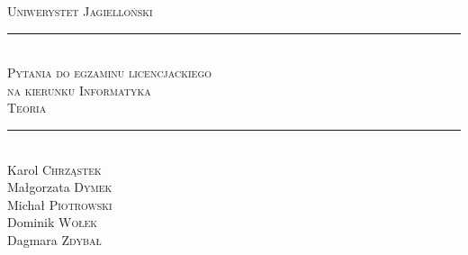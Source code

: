 \documentclass[12pt]{article}
\begin{document}
    \begin{titlepage}

        \newcommand{\HRule}{\rule{\linewidth}{0.5mm}}

        \center

        \textsc{\LARGE Uniwerystet Jagielloński}\\[1.5cm]

        \HRule \\[0.4cm]
        \textsc{\Large Pytania do egzaminu licencjackiego}\\[0.4cm]
        \textsc{\large na kierunku Informatyka}\\[0.4cm]
        \textsc{\Large Teoria}\\[0.4cm]
        \HRule \\[1.0cm]

        \Large %
        Karol \textsc{Chrząstek}\\
        Małgorzata \textsc{Dymek}\\
        Michał \textsc{Piotrowski}\\
        Dominik \textsc{Wołek}\\
        Dagmara \textsc{Zdybał}\\[1.5cm]


\end{titlepage}
\end{document}
